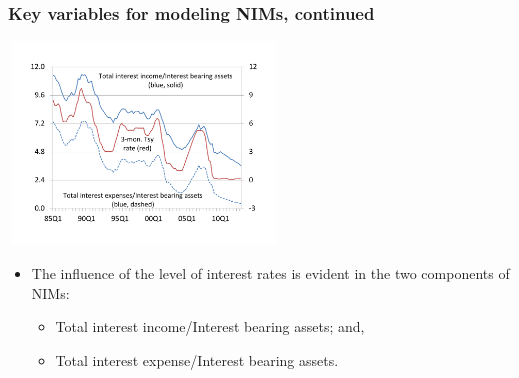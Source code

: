 \documentclass[handout]{beamer}
\begin{document}
\begin{frame}
\frametitle{Key variables for modeling NIMs, continued}

\vspace{0.1in}\hspace{0.65in}\includegraphics[height=5.4cm,width=7.2cm]{nims_components_crop.pdf}

\begin{itemize}
\item\vspace{0.1in} The influence of the level of interest rates is evident in the two components of NIMs:
\begin{itemize}
\item \vspace{0.025in} Total interest income/Interest bearing assets; and,
\item \vspace{0.025in} Total interest expense/Interest bearing assets.
\end{itemize}
\end{itemize}
\end{frame}
\end{document}
